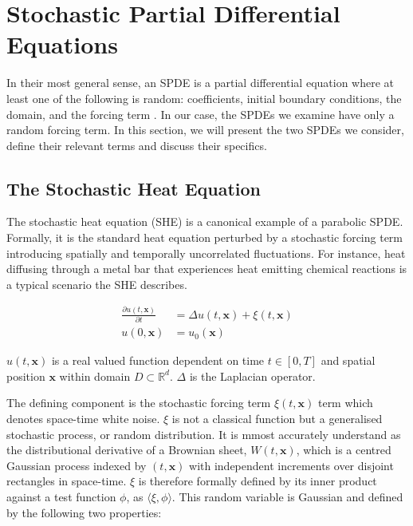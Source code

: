\section{Stochastic Partial Differential Equations}

In their most general sense, an SPDE is a partial differential equation
where at least one of the following is random: coefficients, 
initial boundary conditions, the domain, and the forcing term 
\cite{lototsky2017stochastic}. In our case, 
the SPDEs we examine have only a random forcing term. In this section, 
we will present the two SPDEs we consider, define their relevant 
terms and discuss their specifics.

\subsection{The Stochastic Heat Equation}

The stochastic heat equation (SHE) is a canonical example of a parabolic SPDE.
Formally, it is the standard heat equation perturbed by a stochastic
forcing term introducing spatially and temporally uncorrelated 
fluctuations. For instance, heat diffusing through a metal bar 
that experiences heat emitting chemical reactions is a typical scenario the SHE
describes.

\begin{align}\label{eq:she_spde}
\frac{\partial u(t,\mathbf{x})}{\partial t} &= \Delta u(t,\mathbf{x}) + \xi(t,\mathbf{x})
\tag{SHE}\\
u(0, \mathbf{x}) &= u_0(\mathbf{x})
\end{align}

$u(t,\mathbf{x})$ is a real valued function dependent on time $t \in [0, T]$ and 
spatial position $\mathbf{x}$ within domain $D \subset \mathbb{R}^d$. $\Delta$ is the Laplacian operator.

The defining component is the stochastic forcing term $\xi(t,\mathbf{x})$ term which denotes 
space-time white noise. $\xi$ is not a classical function but a generalised 
stochastic process, or random distribution. It is mmost accurately understand as the 
distributional derivative of a Brownian sheet, $W(t,\mathbf{x})$, which is a centred Gaussian 
process indexed by $(t,\mathbf{x})$ with independent increments over disjoint rectangles in 
space-time. $\xi$ is therefore formally defined by its inner product against a test function $\phi$,
as $\langle\xi, \phi\rangle$. This random variable is Gaussian and defined by the following two properties:

